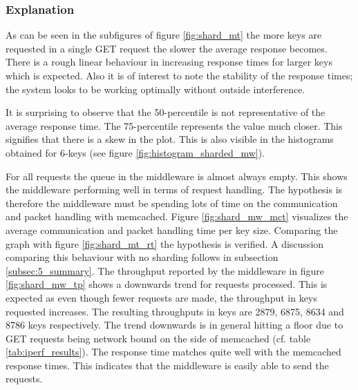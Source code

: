         \subsubsection{Explanation\label{subsubsec:5_sharded_summary}}

            As can be seen in the subfigures of figure \ref{fig:shard_mt} the more keys are requested in a single GET
            request the slower the average response becomes. There is a rough linear behaviour in increasing response
            times for larger keys which is expected. Also it is of interest to note the stability of the response times;
            the system looks to be working optimally without outside interference.

            It is surprising to observe that the 50-percentile is not representative of the average response time. The
            75-percentile represents the value much closer. This signifies that there is a skew in the plot. This is
            also visible in the histograms obtained for 6-keys (see figure \ref{fig:histogram_sharded_mw}).

            For all requests the queue in the middleware is almost always empty. This shows the middleware performing
            well in terms of request handling. The hypothesis is therefore the middleware must be spending lots of time
            on the communication and packet handling with memcached. Figure \ref{fig:shard_mw_mct} visualizes the
            average communication and packet handling time per key size. Comparing the graph with figure
            \ref{fig:shard_mt_rt} the hypothesis is verified. A discussion comparing this behaviour with no sharding
            follows in subsection \ref{subsec:5_summary}.\newline
            The throughput reported by the middleware in figure \ref{fig:shard_mw_tp} shows a downwards trend for
            requests processed. This is expected as even though fewer requests are made, the throughput in keys
            requested increases. The resulting throughputs in keys are 2879, 6875, 8634 and 8786 keys respectively. The
            trend downwards is in general hitting a floor due to GET requests being network bound on the side of
            memcached (cf. table \ref{tab:iperf_results}).
            The response time matches quite well with the memcached response times. This indicates that the middleware
            is easily able to send the requests.

